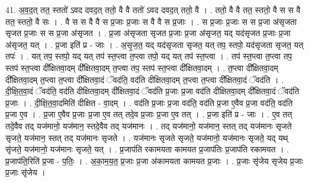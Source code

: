 \documentclass[17pt]{extarticle}
\begin{document}
41. अ॒व॒द॒त् तत॒ स्ततो॑ ऽवद दवद॒त् ततो॒ वै वै ततो॑ ऽवद दवद॒त् ततो॒ वै । . ततो॒ वै वै तत॒ स्ततो॒ वै स स वै तत॒ स्ततो॒ वै सः । . वै स स वै वै स प्र॒जाः प्र॒जाः स वै वै स प्र॒जाः । . स प्र॒जाः प्र॒जाः स स प्र॒जा अ॑सृजता सृजत प्र॒जाः स स प्र॒जा अ॑सृजत । . प्र॒जा अ॑सृजता सृजत प्र॒जाः प्र॒जा अ॑सृजत॒ यद् यद॑सृजत प्र॒जाः प्र॒जा अ॑सृजत॒ यत् । . प्र॒जा इति॑ प्र - जाः । . अ॒सृ॒ज॒त॒ यद् यद॑सृजता सृजत॒ यत् तप॒ स्तपो॒ यद॑सृजता सृजत॒ यत् तपः॑ । . यत् तप॒ स्तपो॒ यद् यत् तप॑ स्त॒प्त्वा त॒प्त्वा तपो॒ यद् यत् तप॑ स्त॒प्त्वा । . तप॑ स्त॒प्त्वा त॒प्त्वा तप॒ स्तप॑ स्त॒प्त्वा दी᳚क्षितवा॒दम् दी᳚क्षितवा॒दम् त॒प्त्वा तप॒ स्तप॑ स्त॒प्त्वा दी᳚क्षितवा॒दम् । . त॒प्त्वा दी᳚क्षितवा॒दम् दी᳚क्षितवा॒दम् त॒प्त्वा त॒प्त्वा दी᳚क्षितवा॒दं ॅवद॑ति॒ वद॑ति दीक्षितवा॒दम् त॒प्त्वा त॒प्त्वा दी᳚क्षितवा॒दं ॅवद॑ति । . दी॒क्षि॒त॒वा॒दं ॅवद॑ति॒ वद॑ति दीक्षितवा॒दम् दी᳚क्षितवा॒दं ॅवद॑ति प्र॒जाः प्र॒जा वद॑ति दीक्षितवा॒दम् दी᳚क्षितवा॒दं ॅवद॑ति प्र॒जाः । . दी॒क्षि॒त॒वा॒दमिति॑ दीक्षित - वा॒दम् । . वद॑ति प्र॒जाः प्र॒जा वद॑ति॒ वद॑ति प्र॒जा ए॒वैव प्र॒जा वद॑ति॒ वद॑ति प्र॒जा ए॒व । . प्र॒जा ए॒वैव प्र॒जाः प्र॒जा ए॒व तत् तदे॒व प्र॒जाः प्र॒जा ए॒व तत् । . प्र॒जा इति॑ प्र - जाः । . ए॒व तत् तदे॒वैव तद् यज॑मानो॒ यज॑मान॒ स्तदे॒वैव तद् यज॑मानः । . तद् यज॑मानो॒ यज॑मान॒ स्तत् तद् यज॑मानः सृजते सृजते॒ यज॑मान॒ स्तत् तद् यज॑मानः सृजते । . यज॑मानः सृजते सृजते॒ यज॑मानो॒ यज॑मानः सृजते॒ यद् यथ् सृ॑जते॒ यज॑मानो॒ यज॑मानः सृजते॒ यत् । . प्र॒जाप॑ति रकामयता कामयत प्र॒जाप॑तिः प्र॒जाप॑ति रकामयत । . प्र॒जाप॑ति॒रिति॑ प्र॒जा - प॒तिः॒ । . अ॒का॒म॒य॒त॒ प्र॒जाः प्र॒जा अ॑कामयता कामयत प्र॒जाः । . प्र॒जाः सृ॑जेय सृजेय प्र॒जाः प्र॒जाः सृ॑जेय । \newline
\end{document}
